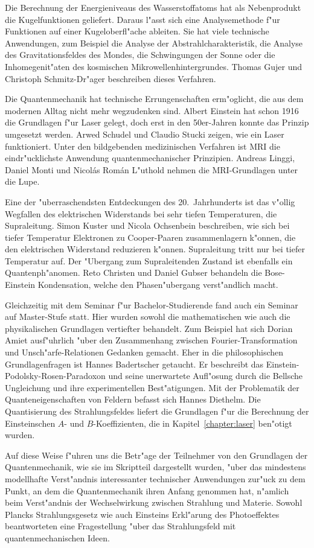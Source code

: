 Die Berechnung der Energieniveaus des Wasserstoffatoms hat als
Nebenprodukt die Kugelfunktionen geliefert.
Daraus l"asst sich eine Analysemethode f"ur Funktionen auf einer
Kugeloberfl"ache ableiten.
Sie hat viele technische Anwendungen, zum Beispiel die Analyse der
Abstrahlcharakteristik, die Analyse des Gravitationsfeldes des
Mondes, die Schwingungen der Sonne oder die Inhomegenit"aten des
kosmischen Mikrowellenhintergrundes.
Thomas Gujer und Christoph Schmitz-Dr"ager beschreiben dieses Verfahren.

Die Quantenmechanik hat technische Errungenschaften erm"oglicht, die
aus dem modernen Alltag nicht mehr wegzudenken sind.
Albert Einstein hat schon 1916 die Grundlagen f"ur Laser gelegt,
doch erst in den 50er-Jahren konnte das Prinzip umgesetzt werden.
Arwed Schudel und Claudio Stucki zeigen, wie ein Laser funktioniert.
Unter den bildgebenden medizinischen Verfahren ist MRI die eindr"ucklichste
Anwendung quantenmechanischer Prinzipien.
Andreas Linggi, Daniel Monti und Nicol\'as Rom\'an L"uthold nehmen
die MRI-Grundlagen unter die Lupe.

Eine der "uberraschendsten Entdeckungen des 20.~Jahrhunderts ist das
v"ollig Wegfallen des elektrischen Widerstands bei sehr tiefen 
Temperaturen, die Supraleitung.
Simon Kuster und Nicola Ochsenbein beschreiben, wie sich bei tiefer
Temperatur Elektronen zu Cooper-Paaren zusammenlagern k"onnen, die
den elektrischen Widerstand reduzieren k"onnen.
Supraleitung tritt nur bei tiefer Temperatur auf.
Der "Ubergang zum Supraleitenden Zustand ist ebenfalls ein Quantenph"anomen.
Reto Christen und Daniel Gubser behandeln die Bose-Einstein Kondensation,
welche den Phasen"ubergang verst"andlich macht.

Gleichzeitig mit dem Seminar f"ur Bachelor-Studierende fand auch ein
Seminar auf Master-Stufe statt.
Hier wurden sowohl die mathematischen wie auch die physikalischen Grundlagen
vertiefter behandelt. Zum Beispiel hat sich Dorian Amiet ausf"uhrlich
"uber den Zusammenhang zwischen Fourier-Transformation und 
Unsch"arfe-Relationen Gedanken gemacht.
Eher in die philosophischen Grundlagenfragen ist Hannes Badertscher
getaucht. Er beschreibt das Einstein-Podolsky-Rosen-Paradoxon und seine
unerwartete Aufl"osung durch die Bellsche Ungleichung und ihre experimentellen
Best"atigungen.
Mit der Problematik der Quanteneigenschaften von Feldern befasst sich
Hannes Diethelm. 
Die Quantisierung des Strahlungsfeldes liefert die Grundlagen f"ur die
Berechnung der Einsteinschen $A$- und $B$-Koeffizienten, die in 
Kapitel~\ref{chapter:laser} ben"otigt wurden.

Auf diese Weise f"uhren uns die Betr"age der Teilnehmer von den Grundlagen
der Quantenmechanik, wie sie im Skriptteil dargestellt wurden,
"uber das mindestens modellhafte Verst"andnis interessanter technischer
Anwendungen zur"uck zu dem Punkt, an dem die Quantenmechanik ihren
Anfang genommen hat, n"amlich beim Verst"andnis der Wechselwirkung
zwischen Strahlung und Materie. Sowohl Plancks Strahlungsgesetz wie
auch Einsteins Erkl"arung des Photoeffektes beantworteten eine Fragestellung
"uber das Strahlungsfeld mit quantenmechanischen Ideen.



